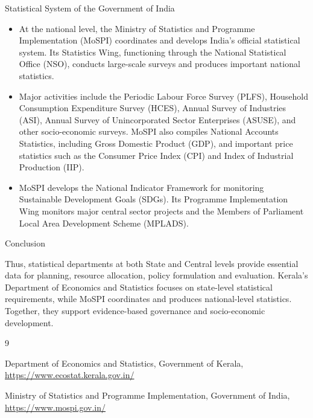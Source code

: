 \documentclass[aspectratio=169]{beamer}
\begin{document}
\begin{frame}{Statistical System of the Government of India}
\begin{itemize}
 \item At the national level, the Ministry of Statistics and Programme Implementation (MoSPI) coordinates and develops India's official statistical system. Its Statistics Wing, functioning through the National Statistical Office (NSO), conducts large-scale surveys and produces important national statistics.

\item Major activities include the Periodic Labour Force Survey (PLFS), Household Consumption Expenditure Survey (HCES), Annual Survey of Industries (ASI), Annual Survey of Unincorporated Sector Enterprises (ASUSE), and other socio-economic surveys. MoSPI also compiles National Accounts Statistics, including Gross Domestic Product (GDP), and important price statistics such as the Consumer Price Index (CPI) and Index of Industrial Production (IIP).

\item MoSPI develops the National Indicator Framework for monitoring Sustainable Development Goals (SDGs). Its Programme Implementation Wing monitors major central sector projects and the Members of Parliament Local Area Development Scheme (MPLADS).
\end{itemize}
\end{frame}
\begin{frame}{Conclusion}
    
Thus, statistical departments at both State and Central levels provide essential data for planning, resource allocation, policy formulation and evaluation. Kerala's Department of Economics and Statistics focuses on state-level statistical requirements, while MoSPI coordinates and produces national-level statistics. Together, they support evidence-based governance and socio-economic development.

\color{black}
\begin{thebibliography}{9}

Department of Economics and Statistics, Government of Kerala,
\url{https://www.ecostat.kerala.gov.in/}

Ministry of Statistics and Programme Implementation, Government of India,
\url{https://www.mospi.gov.in/}

\end{thebibliography}
\end{frame}
\end{document}
